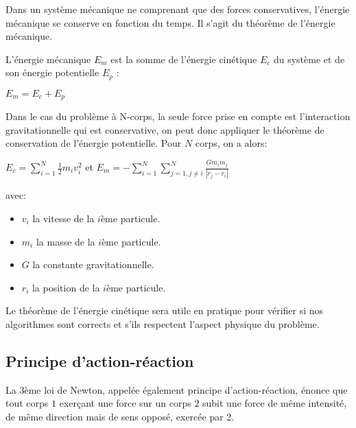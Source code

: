 Dans un système mécanique ne comprenant que des forces conservatives, l'énergie mécanique se conserve en fonction du temps. Il s'agit du théorème de l'énergie mécanique.

L'énergie mécanique $E_m$ est la somme de l'énergie cinétique $E_c$ du système et de son énergie potentielle $E_p$ :

\begin{center}
$E_m = E_c + E_p$
\end{center}

Dans le cas du problème à N-corps, la seule force prise en compte est l'interaction gravitationnelle qui est conservative, on peut donc appliquer le théorème de conservation de l'énergie potentielle. Pour $N$ corps, on a alors:

\begin{center}
$E_c = \sum\limits_{i=1}^{N} \frac{1}{2}m_i v_i^{2}$  et $E_m =- \sum\limits_{i=1}^{N} \sum\limits_{j=1,j \ne i}^{N} \frac{G m_i m_j}{| r_j - r_i |}$
\end{center}

avec:
\begin{itemize}
\item $v_i$ la vitesse de la $i$ème particule.

\item $m_i$ la masse de la $i$ème particule.

\item $G$ la constante gravitationnelle.

\item $r_i$ la position de la $i$ème particule.

\end{itemize}

\vspace{1mm}
Le théorème de l'énergie cinétique sera utile en pratique pour vérifier si nos algorithmes sont corrects et s'ils respectent l'aspect physique du problème.

\vspace{2mm}
\subsection{Principe d'action-réaction}
\vspace{2mm}

La 3ème loi de Newton, appelée également principe d'action-réaction, énonce que tout corps $1$ exerçant une force sur un corps $2$ subit une force de même intensité, de même direction mais de sens opposé, exercée par 2.

